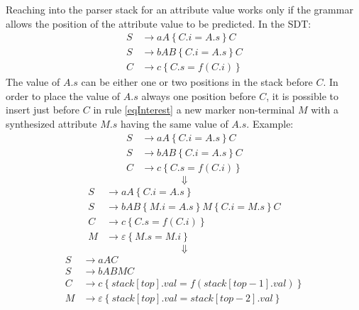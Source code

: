 Reaching into the parser stack for an attribute value works only if the grammar allows the position of the attribute value to be predicted.
In the SDT:
\begin{align}
    S &\to aA \left\{C.i = A.s\right\}C \\
    S &\to bAB \left\{C.i = A.s\right\}C \label{eqInterest}\\
    C &\to c \left\{C.s = f(C.i)\right\}
\end{align}
The value of $A.s$ can be either one or two positions in the stack before $C$.
In order to place the value of $A.s$ always one position before $C$, it is possible to insert just before $C$ in rule \ref{eqInterest} a new marker non-terminal $M$ with a synthesized attribute $M.s$ having the same value of $A.s$.
Example:
\begin{align*}
    S &\to aA \left\{C.i = A.s\right\}C \\
    S &\to bAB \left\{C.i = A.s\right\}C \\
    C &\to c \left\{C.s = f(C.i)\right\}
\end{align*}
$$
    \Downarrow
$$
\begin{align*}
    S &\to aA \left\{C.i = A.s\right\} \\
    S &\to bAB \left\{M.i = A.s\right\}M\left\{C.i = M.s\right\}C \\
    C &\to c \left\{C.s = f(C.i)\right\} \\
    M &\to \varepsilon \left\{M.s = M.i\right\}
\end{align*}
$$
    \Downarrow
$$
\begin{align*}
    S &\to aAC \\
    S &\to bABMC \\
    C &\to c \left\{stack[top].val = f(stack[top - 1].val)\right\} \\
    M &\to \varepsilon \left\{stack[top].val = stack[top - 2].val\right\}
\end{align*}

